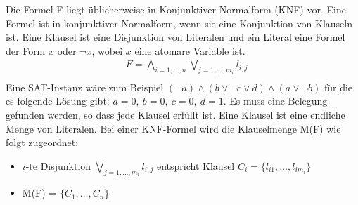\documentclass[a4,abstract=on]{scrartcl}
\begin{document}
Die Formel F liegt üblicherweise in Konjunktiver Normalform (KNF) vor. Eine Formel ist in konjunktiver Normalform, wenn sie eine Konjunktion von Klauseln ist. Eine Klausel ist eine Disjunktion von Literalen und ein Literal eine Formel der Form $x$ oder $\neg x$, wobei $x$ eine atomare Variable ist.\\
\begin{align*}
&F = \bigwedge_{i=1, \dots ,n} \bigvee_{j=1,\dots ,m_i}{l_{i,j}}\\
\end{align*}
Eine SAT-Instanz wäre zum Beispiel $(\neg a) \wedge (b \vee \neg c \vee d) \wedge (a \vee \neg b)$  für die es folgende Lösung gibt: $a = 0,{~} b = 0,{~} c= 0, {~} d = 1$. Es muss eine Belegung gefunden werden, so dass jede Klausel erfüllt ist.
Eine Klausel ist eine endliche Menge von Literalen. Bei einer KNF-Formel wird die Klauselmenge M(F) wie folgt zugeordnet:\\
\begin{itemize}
\item $i$-te Disjunktion $\bigvee_{j=1,\dots ,m_i}{l_{i,j}}$ entspricht Klausel $C_i = \{l_{i1}, \dots, l_{im_i}\}$
\item M(F) = $\{C_1, \dots, C_n\}$
\end{itemize}
\end{document}
